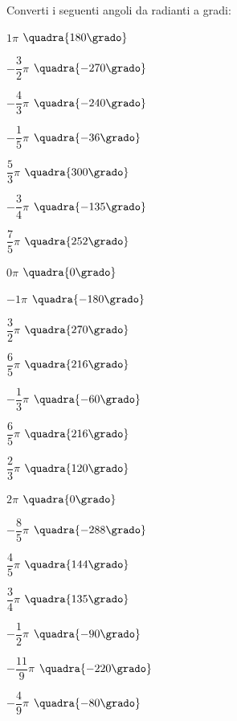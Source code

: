 \begin{esercizio}\label{ese:gonio.2}
 Converti i seguenti angoli da radianti a gradi:
\begin{multicols}{3}
 \begin{enumeratea}
  \item  $1 \pi$
   \hfill $\quadra{180 \grado}$
  \item  $-\dfrac{3}{2} \pi$
   \hfill $\quadra{-270 \grado}$
  \item  $-\dfrac{4}{3} \pi$
   \hfill $\quadra{-240 \grado}$
  \item  $-\dfrac{1}{5} \pi$
   \hfill $\quadra{-36 \grado}$
  \item  $\dfrac{5}{3} \pi$
   \hfill $\quadra{300 \grado}$
  \item  $-\dfrac{3}{4} \pi$
   \hfill $\quadra{-135 \grado}$
  \item  $\dfrac{7}{5} \pi$
   \hfill $\quadra{252 \grado}$
  \item  $0 \pi$
   \hfill $\quadra{0 \grado}$
  \item  $-1 \pi$
   \hfill $\quadra{-180 \grado}$
  \item  $\dfrac{3}{2} \pi$
   \hfill $\quadra{270 \grado}$
  \item  $\dfrac{6}{5} \pi$
   \hfill $\quadra{216 \grado}$
  \item  $-\dfrac{1}{3} \pi$
   \hfill $\quadra{-60 \grado}$
  \item  $\dfrac{6}{5} \pi$
   \hfill $\quadra{216 \grado}$
  \item  $\dfrac{2}{3} \pi$
   \hfill $\quadra{120 \grado}$
  \item  $2 \pi$
   \hfill $\quadra{0 \grado}$
  \item  $-\dfrac{8}{5} \pi$
   \hfill $\quadra{-288 \grado}$
  \item  $\dfrac{4}{5} \pi$
   \hfill $\quadra{144 \grado}$
  \item  $\dfrac{3}{4} \pi$
   \hfill $\quadra{135 \grado}$
  \item  $-\dfrac{1}{2} \pi$
   \hfill $\quadra{-90 \grado}$
  \item  $-\dfrac{11}{9} \pi$
   \hfill $\quadra{-220 \grado}$
  \item  $-\dfrac{4}{9} \pi$
   \hfill $\quadra{-80 \grado}$
 \end{enumeratea}
\end{multicols}
\end{esercizio}

